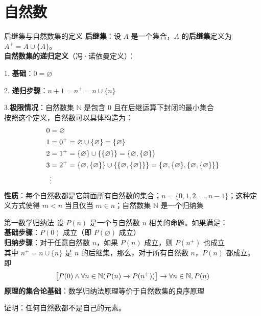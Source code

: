 \section{自然数}
\begin{definition}{后继集与自然数集的定义}{}
\textbf{后继集}：设 $A$ 是一个集合，$A$ 的\textbf{后继集}定义为 $A^{+} = A \cup \{A\}$。\\
\textbf{自然数集的递归定义}（冯·诺依曼定义）：

1. \textbf{基础}：$0 = \varnothing$

2. \textbf{递归步骤}：$n + 1 = n^{+} = n \cup \{n\}$

3.\textbf{极限情况}：自然数集 $\mathbb{N}$ 是包含 $0$ 且在后继运算下封闭的最小集合\\
按照这个定义，自然数可以具体构造为：\vspace{-10pt}
\begin{align*}
0 &= \varnothing \\
1 &= 0^{+} = \varnothing \cup \{\varnothing\} = \{\varnothing\} \\
2 &= 1^{+} = \{\varnothing\} \cup \{\{\varnothing\}\} = \{\varnothing, \{\varnothing\}\} \\
3 &= 2^{+} = \{\varnothing, \{\varnothing\}\} \cup \{\{\varnothing, \{\varnothing\}\}\} = \{\varnothing, \{\varnothing\}, \{\varnothing, \{\varnothing\}\}\} \\
&\vdots
\vspace{-10pt}\end{align*}
\textbf{性质}：每个自然数都是它前面所有自然数的集合；$n = \{0, 1, 2, \ldots, n-1\}$；这种定义方式使得 $m < n$ 当且仅当 $m \in n$；自然数集 $\mathbb{N}$ 是一个归纳集
\end{definition}
\begin{definition}{第一数学归纳法}{}
    设 $P(n)$ 是一个与自然数 $n$ 相关的命题。如果满足：\\
    \textbf{基础步骤}：$P(0)$ 成立（即 $P(\varnothing)$ 成立）\\
    \textbf{归纳步骤}：对于任意自然数 $n$，如果 $P(n)$ 成立，则 $P(n^{+})$ 也成立\\
    其中 $n^{+} = n \cup \{n\}$ 是 $n$ 的后继集，那么，对于所有自然数 $n$，$P(n)$ 都成立。即\vspace{-10pt}
\[\bigl[P(0) \land \forall n \in \mathbb{N}(P(n) \rightarrow P(n^{+}))\bigr] \rightarrow \forall n \in \mathbb{N}, P(n)\vspace{-10pt}\]
\textbf{原理的集合论基础}：数学归纳法原理等价于自然数集的良序原理
\end{definition}
证明：任何自然数都不是自己的元素。

